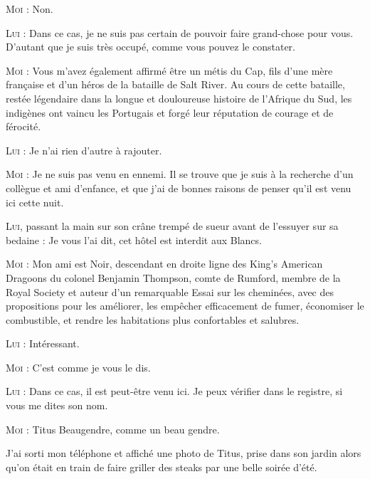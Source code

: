 \begin{dialogue}
\textsc{Moi} : Non.

\textsc{Lui} : Dans ce cas, je ne suis pas certain de pouvoir faire grand-chose pour vous. D’autant que je suis très occupé, comme vous pouvez le constater.

\textsc{Moi} : Vous m’avez également affirmé être un métis du Cap, fils d’une mère française et d’un héros de la bataille de Salt River. Au cours de cette bataille, restée légendaire dans la longue et douloureuse histoire de l’Afrique du Sud, les indigènes ont vaincu les Portugais et forgé leur réputation de courage et de férocité.

\textsc{Lui} : Je n’ai rien d’autre à rajouter.

\textsc{Moi} : Je ne suis pas venu en ennemi. Il se trouve que je suis à la recherche d’un collègue et ami d’enfance, et que j’ai de bonnes raisons de penser qu’il est venu ici cette nuit.

\textsc{Lui}, passant la main sur son crâne trempé de sueur avant de l’essuyer sur sa bedaine : Je vous l’ai dit, cet hôtel est interdit aux Blancs.

\textsc{Moi} : Mon ami est Noir, descendant en droite ligne des King’s American Dragoons du colonel Benjamin Thompson, comte de Rumford, membre de la Royal Society et auteur d’un remarquable Essai sur les cheminées, avec des propositions pour les améliorer, les empêcher efficacement de fumer, économiser le combustible, et rendre les habitations plus confortables et salubres.

\textsc{Lui} : Intéressant.

\textsc{Moi} : C’est comme je vous le dis.

\textsc{Lui} : Dans ce cas, il est peut-être venu ici. Je peux vérifier dans le registre, si vous me dites son nom.

\textsc{Moi} : Titus Beaugendre, comme un beau gendre.

\end{dialogue}

J’ai sorti mon téléphone et affiché une photo de Titus, prise dans son jardin alors qu’on était en train de faire griller des steaks par une belle soirée d’été.

